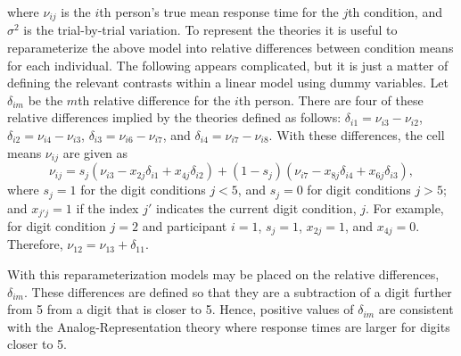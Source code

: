 \documentclass[english,,man]{apa6}
\begin{document}
where \(\nu_{ij}\) is the \(i\)th person's true mean response time for the \(j\)th condition, and \(\sigma^2\) is the trial-by-trial variation.
To represent the theories it is useful to reparameterize the above model into relative differences between condition means for each individual. The following appears complicated, but it is just a matter of defining the relevant contrasts within a linear model using dummy variables. Let \(\delta_{im}\) be the \(m\)th relative difference for the \(i\)th person. There are four of these relative differences implied by the theories defined as follows: \(\delta_{i1}=\nu_{i3}-\nu_{i2}\), \(\delta_{i2}=\nu_{i4}-\nu_{i3}\), \(\delta_{i3}=\nu_{i6}-\nu_{i7}\), and \(\delta_{i4}=\nu_{i7}-\nu_{i8}\). With these differences, the cell means \(\nu_{ij}\) are given as
\begin{equation}\label{modelex2}
\nu_{ij} = {s_j}\left(\nu_{i3} - x_{2j}\delta_{i1} + x_{4j}\delta_{i2}\right) + (1-s_j)\left(\nu_{i7} - x_{8j}\delta_{i4} + x_{6j}\delta_{i3}\right),
\end{equation}
where \(s_j=1\) for the digit conditions \(j<5\), and \(s_j=0\) for digit conditions \(j>5\); and \(x_{j'j}=1\) if the index \(j'\) indicates the current digit condition, \(j\). For example, for digit condition \(j = 2\) and participant \(i = 1\), \(s_j = 1\), \(x_{2j} = 1\), and \(x_{4j} = 0\). Therefore, \(\nu_{12} = \nu_{13} + \delta_{11}\).

With this reparameterization models may be placed on the relative differences, \(\delta_{im}\). These differences are defined so that they are a subtraction of a digit further from 5 from a digit that is closer to 5. Hence, positive values of \(\delta_{im}\) are consistent with the Analog-Representation theory where response times are larger for digits closer to 5.
\end{document}
